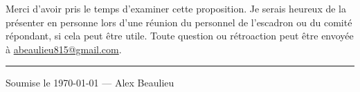 \documentclass[11pt,letterpaper]{article}
\makeatletter
\newcommand{\propAuthor}{Alex Beaulieu}
\newcommand{\propEmail}{abeaulieu815@gmail.com}
\newcommand{\propDate}{\today}
\makeatother
\begin{document}
\vspace{1.5em}
\noindent
Merci d'avoir pris le temps d'examiner cette proposition. Je serais heureux de la présenter en personne lors d'une réunion du personnel de l'escadron ou du comité répondant, si cela peut être utile. Toute question ou rétroaction peut être envoyée à \href{mailto:\propEmail}{\propEmail}.

\vspace{2em}
\noindent\rule{\linewidth}{0.4pt}
\begin{center}
\small\color{muted}
Soumise le \propDate{} --- \propAuthor
\end{center}
\end{document}
